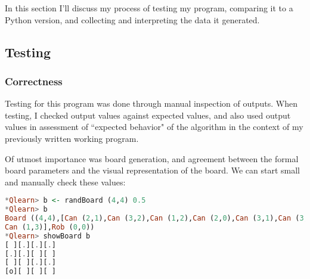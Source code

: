 \documentclass[12pt,a4paper]{article}
\begin{document}
	\par In this section I'll discuss my process of testing my program, comparing it to a Python version, and collecting and interpreting the data it generated.
	
		\subsection{Testing}
		
			\subsubsection{Correctness}
			
			\par Testing for this program was done through manual inspection of outputs. When testing, I checked output values against expected values, and also used output values in assessment of ``expected behavior" of the algorithm in the context of my previously written working program.
			\par Of utmost importance was board generation, and agreement between the formal board parameters and the visual representation of the board. We can start small and manually check these values: \\
			\begin{lstlisting}[language=Haskell,numbers=none]
*Qlearn> b <- randBoard (4,4) 0.5
*Qlearn> b
Board ((4,4),[Can (2,1),Can (3,2),Can (1,2),Can (2,0),Can (3,1),Can (3,3),
Can (1,3)],Rob (0,0))
*Qlearn> showBoard b
[ ][.][.][.]
[.][.][ ][ ]
[ ][ ][.][.]
[o][ ][ ][ ]
			\end{lstlisting}\ \\
			
\end{document}
